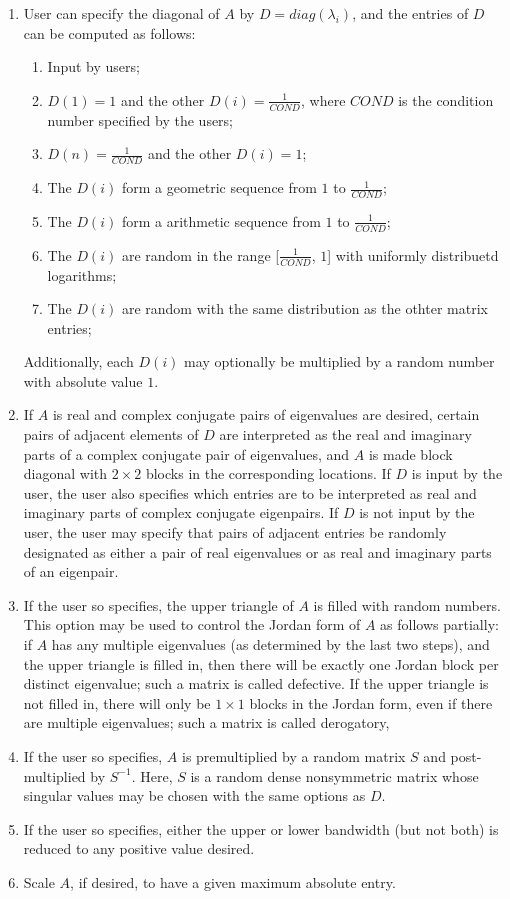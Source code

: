 \begin{enumerate}
	\item User can specify the diagonal of $A$ by $D=diag(\lambda_i)$, and the entries of $D$ can be computed as follows:
	\begin{enumerate}
		\item Input by users;
		\item $D(1)=1$ and the other $D(i)=\frac{1}{COND}$, where $COND$ is the condition number specified by the users;
		\item $D(n)=\frac{1}{COND}$ and the other $D(i)=1$;
		\item The $D(i)$ form a geometric sequence from $1$ to $\frac{1}{COND}$;
		\item The $D(i)$ form a arithmetic sequence from $1$ to $\frac{1}{COND}$;
		\item The $D(i)$ are random in the range [$\frac{1}{COND}$, $1$] with uniformly distribuetd logarithms;
		\item The $D(i)$ are random with the same distribution as the othter matrix entries;
	\end{enumerate}
	
	Additionally, each $D(i)$ may optionally be multiplied by a random number with absolute value $1$.
	
	\item If $A$ is real and complex conjugate pairs of eigenvalues are desired, certain pairs of adjacent elements of $D$ are interpreted as the real and imaginary parts of a complex conjugate pair of eigenvalues, and $A$ is made block diagonal with $2 \times 2$ blocks in the corresponding locations. If $D$ is input by the user, the user also specifies which entries are to be interpreted as real and imaginary parts of complex conjugate eigenpairs. If $D$ is not input by the user, the user may specify that pairs of adjacent entries be randomly designated as either a pair of real eigenvalues or as real and imaginary parts of an eigenpair.
	
	\item If the user so specifies, the upper triangle of $A$ is filled with random numbers. This option may be used to control the Jordan form of $A$ as follows partially: if $A$ has any multiple eigenvalues (as determined by the last two steps), and the upper triangle is filled in, then there will be exactly one Jordan block per distinct eigenvalue; such a matrix is called defective. If the upper triangle is not filled in, there will only be $1\times1$ blocks in the Jordan form, even if there are multiple eigenvalues; such a matrix is called derogatory,
	
	\item If the user so specifies, $A$ is premultiplied by a random matrix $S$ and post-multiplied by $S^{-1}$. Here, $S$ is a random dense nonsymmetric matrix whose singular values may be chosen with the same options as $D$. 
	\item If the user so specifies, either the upper or lower bandwidth (but not both) is reduced to any positive value desired.
	\item Scale $A$, if desired, to have a given maximum absolute entry.
\end{enumerate}

